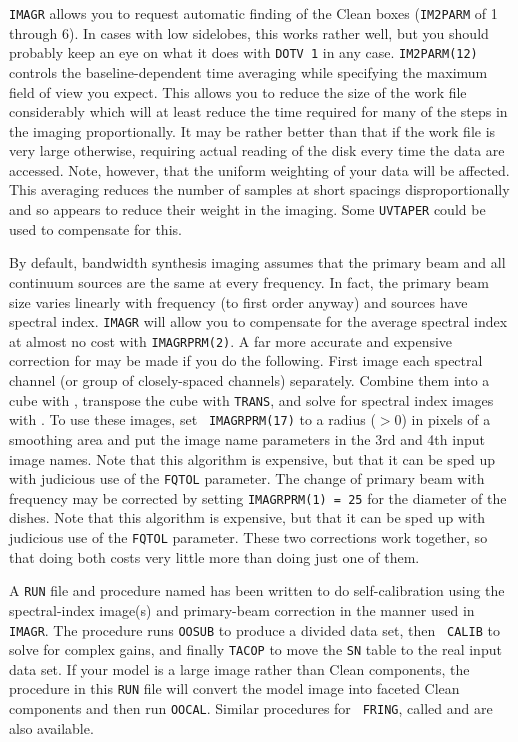 {\tt IMAGR} allows you to request automatic finding of the Clean boxes
({\tt IM2PARM} of 1 through 6).  In cases with low sidelobes, this
works rather well, but you should probably keep an eye on what it does
with {\tt DOTV 1} in any case.  {\tt IM2PARM(12)} controls the
baseline-dependent time averaging while specifying the maximum field
of view you expect.  This allows you to reduce the size of the work
file considerably which will at least reduce the time required for
many of the steps in the imaging proportionally.  It may be rather
better than that if the work file is very large otherwise, requiring
actual reading of the disk every time the data are accessed.  Note,
however, that the uniform weighting of your data will be affected.
This averaging reduces the number of samples at short spacings
disproportionally and so appears to reduce their weight in the
imaging.  Some {\tt UVTAPER} could be used to compensate for this.

By default, bandwidth synthesis imaging assumes that the primary beam
and all continuum sources are the same at every frequency.  In fact,
the primary beam size varies linearly with frequency (to first order
anyway) and sources have spectral index.  {\tt IMAGR} will allow you
to compensate for the average spectral index at almost no cost with
{\tt IMAGRPRM(2)}\@.  A far more accurate and expensive correction for
 may be made if you do the following.  First
image each spectral channel (or group of closely-spaced channels)
separately.  Combine them into a cube with {\tt {}},
transpose the cube with {\tt TRANS}, and solve for spectral index
images with {\tt {}}\@.  To use these images, set {\tt
IMAGRPRM(17)} to a radius ($> 0$) in pixels of a smoothing area and
put the image name parameters in the 3rd and 4th input image names.
Note that this algorithm is expensive, but that it can be sped up with
judicious use of the {\tt FQTOL} parameter.  The change of primary
beam with frequency may be corrected by setting {\tt IMAGRPRM(1) = 25}
for the diameter of the  dishes.  Note that this algorithm
is expensive, but that it can be sped up with judicious use of the
{\tt FQTOL} parameter.  These two corrections work together, so that
doing both costs very little more than doing just one of them.

A {\tt RUN} file and procedure named {\tt {}} has been
written to do self-calibration using the spectral-index image(s) and
primary-beam correction in the manner used in {\tt IMAGR}\@.  The
procedure runs {\tt OOSUB} to produce a divided data set, then {\tt
CALIB} to solve for complex gains, and finally {\tt TACOP} to move the
{\tt SN} table to the real input data set.  If your model is a large
image rather than Clean components, the procedure {\tt {}}
in this {\tt RUN} file will convert the model image into faceted Clean
components and then run {\tt OOCAL}\@.  Similar procedures for {\tt
FRING}, called {\tt {}} and {\tt {}} are also
available.

